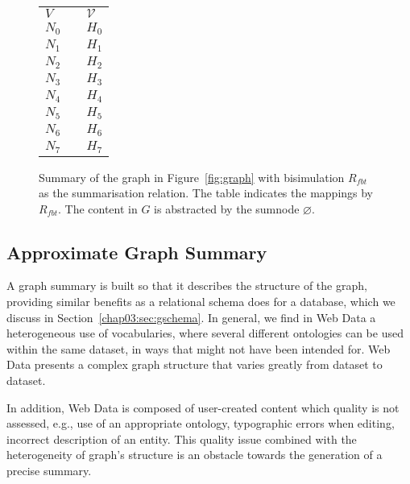 \begin{figure}
	\centering
	\begin{minipage}{.75\textwidth}
		\resizebox{\textwidth}{!}{
			
		}
	\end{minipage}
	\quad
	\begin{minipage}[h]{.2\textwidth}
		\centering
		\caption*{$R_{fbt}\left(V, \mathcal{V}\right)$}
		\begin{tabular}{lc@{\hs}l}
			\toprule
			$V$ & \phantom{a} & $\mathcal{V}$ \\
			\cmidrule{1-1} \cmidrule{3-3}
			$N_0$ & \phantom{a} & $H_0$ \\
			$N_1$ & \phantom{a} & $H_1$ \\
			$N_2$ & \phantom{a} & $H_2$ \\
			$N_3$ & \phantom{a} & $H_3$ \\
			$N_4$ & \phantom{a} & $H_4$ \\
			$N_5$ & \phantom{a} & $H_5$ \\
			$N_6$ & \phantom{a} & $H_6$ \\
			$N_7$ & \phantom{a} & $H_7$ \\
			\bottomrule
		\end{tabular}
	\end{minipage}
	\caption{Summary of the graph in Figure~\ref{fig:graph} with bisimulation $R_{fbt}$ as the summarisation relation. The table indicates the mappings by $R_{fbt}$. The content in $G$ is abstracted by the sumnode $\varnothing$.}
	\label{fig:fbb-summary}
\end{figure}

\subsection{Approximate Graph Summary}
\label{sec:approximate}

A graph summary is built so that it describes the structure of the graph, providing similar benefits as a relational schema does for a database, which we discuss in Section~\ref{chap03:sec:gschema}. In general, we find in Web Data a heterogeneous use of vocabularies, where several different ontologies can be used within the same dataset, in ways that might not have been intended for. Web Data presents a complex graph structure that varies greatly from dataset to dataset.

In addition, Web Data is composed of user-created content which quality is not assessed, e.g., use of an appropriate ontology, typographic errors when editing, incorrect description of an entity. This quality issue combined with the heterogeneity of graph's structure is an obstacle towards the generation of a precise summary.

